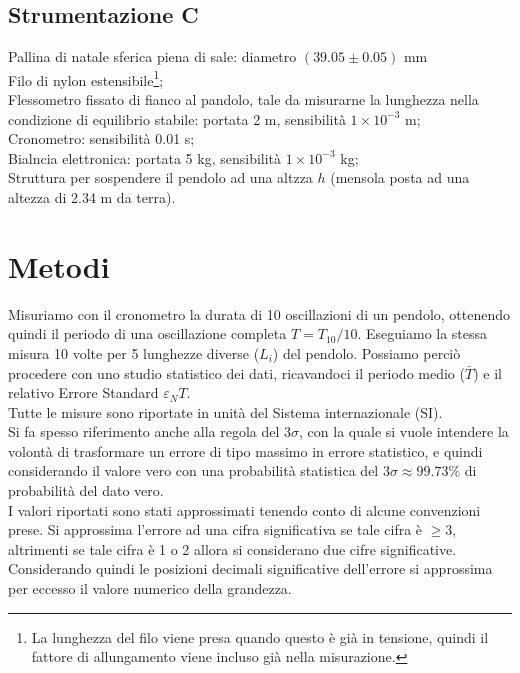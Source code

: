 \documentclass[italian, a4paper, 10pt, twocolumn]{../../style/lab_unige}
\begin{document}
  \newpage

  \subsection{Strumentazione C}
  Pallina di natale sferica piena di sale: diametro $(39.05\pm0.05)$ mm\\
  Filo di nylon estensibile\footnote{La lunghezza del filo viene presa quando questo è già in tensione,
  quindi il fattore di allungamento viene incluso già nella misurazione.};\\
  Flessometro fissato di fianco al pandolo, tale da misurarne la lunghezza nella condizione di equilibrio
  stabile: portata 2 m, sensibilità $1\times10^{-3}$ m;\\
  Cronometro: sensibilità 0.01 s;\\
  Bialncia elettronica: portata 5 kg, sensibilità $1\times10^{-3}$ kg;\\
  Struttura per sospendere il pendolo ad una altzza $h$ (mensola posta ad una altezza di 2.34 m da terra).\\

  \section{Metodi}
  Misuriamo con il cronometro la durata di 10 oscillazioni di un pendolo, ottenendo quindi il periodo 
  di una oscillazione completa $T=T_{10}/10$. Eseguiamo la stessa misura 10 volte per 5 lunghezze 
  diverse ($L_{i}$) del pendolo. Possiamo perciò procedere con uno studio statistico dei dati, 
  ricavandoci il periodo medio ($\bar{T}$) e il relativo Errore Standard $\varepsilon_{N}T$.
  \\

  Tutte le misure sono riportate in unità del Sistema internazionale (SI). \\
  Si fa spesso riferimento anche alla regola del $3\sigma$, con la quale si vuole intendere la volontà 
  di trasformare un errore di tipo massimo in errore statistico, e quindi considerando il valore vero
  con una probabilità statistica del $3\sigma\approx99.73\%$ di probabilità del dato vero.\\
  I valori riportati sono stati approssimati tenendo conto di alcune convenzioni prese. Si 
  approssima l'errore ad una cifra significativa se tale cifra è $\geqslant3$, altrimenti se tale
  cifra è 1 o 2 allora si considerano due cifre significative. Considerando quindi le posizioni decimali
  significative dell'errore si approssima per eccesso il valore numerico della grandezza. 
\end{document}

